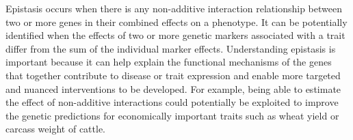 \documentclass[authoryear,preprint,12pt,3p]{elsarticle}
\begin{document}
Epistasis occurs when there is any non-additive interaction relationship between two or more genes in their combined
effects on a phenotype. It can be potentially identified when the effects of two or more genetic markers associated with
a trait differ from the sum of the individual marker effects. Understanding epistasis is important because it can help
explain the functional mechanisms of the genes that together contribute to disease or trait expression and enable more
targeted and nuanced interventions to be developed. For example, being able to estimate the effect of non-additive
interactions could potentially be exploited to improve the genetic predictions \cite[]{Ansarifar.et.al.2020} for
economically important traits such as wheat yield or carcass weight of cattle.



\end{document}
